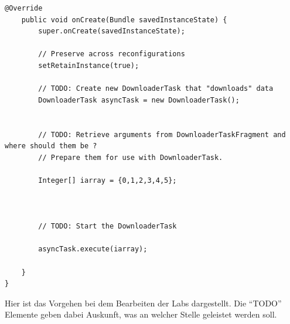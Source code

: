 \documentclass[12pt,a4paper,bibliography=totocnumbered,listof=totocnumbered]{scrartcl}
\begin{document}
\vspace{1em}
\begin{lstlisting}[caption=OnCreate des DownloaderTaskFragment der ersten Lab, label=lst:DownloaderTaskFragment]
@Override
	public void onCreate(Bundle savedInstanceState) {
		super.onCreate(savedInstanceState);

		// Preserve across reconfigurations
		setRetainInstance(true);
		
		// TODO: Create new DownloaderTask that "downloads" data
        DownloaderTask asyncTask = new DownloaderTask();

        	
		// TODO: Retrieve arguments from DownloaderTaskFragment and where should them be ?
		// Prepare them for use with DownloaderTask. 

        Integer[] iarray = {0,1,2,3,4,5};

        
        
		// TODO: Start the DownloaderTask 

        asyncTask.execute(iarray);

	}
}
\end{lstlisting}

Hier ist das Vorgehen bei dem Bearbeiten der Labs dargestellt. Die "`TODO"' Elemente geben dabei Auskunft, was an welcher Stelle geleistet werden soll.
\end{document}
